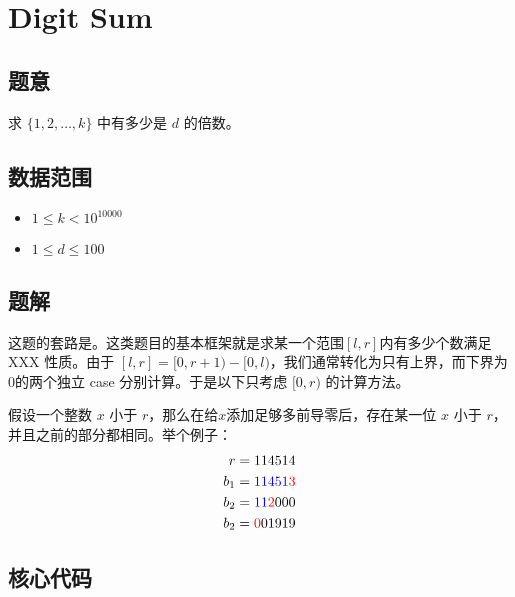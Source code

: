 \section{Digit Sum}
\subsection*{题意}
求 $\{1,2,\ldots,k\}$ 中有多少是 $d$ 的倍数。
\subsection*{数据范围}
\begin{itemize}
\item $1 \leq k < 10^{10000}$
\item $1 \leq d \leq 100$
\end{itemize}

\subsection*{题解}

这题的套路是\textbf{}。这类题目的基本框架就是求某一个范围$[l,r]$内有多少个数满足 XXX 性质。由于 $[l,r] = [0,r+1) - [0,l)$，我们通常转化为只有上界，而下界为$0$的两个独立 case 分别计算。于是以下只考虑 $[0,r)$ 的计算方法。

假设一个整数 $x$ 小于 $r$，那么在给$x$添加足够多前导零后，存在某一位 $x$ 小于 $r$，并且之前的部分都相同。举个例子：
\begin{align*}
    r &= 114514\\
    b_1 &= \color{blue}{11451}\color{red}{3}\\
    b_2 &= \color{blue}{11}\color{red}{2}\color{black}{000}\\
    b_2 &= \color{blue}{}\color{red}{0}\color{black}{01919}\\
\end{align*}






\subsection*{核心代码}
\inputminted[linenos,autogobble]{cpp}{./Code/S.cpp}
\newpage